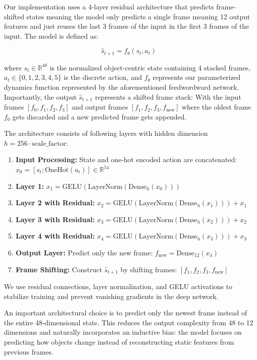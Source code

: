 \documentclass[
	english,
	ruledheaders=section,
	class=report,
	thesis={type=master},
	accentcolor=9c,
	custommargins=true,
	marginpar=false,
	parskip=half-,
	fontsize=11pt,
	pdfa=true,
]{tudapub}
\begin{document}
Our implementation uses a 4-layer residual architecture that predicts
frame-shifted states meaning the model only predicts a single frame meaning 12
output features and just reuses the last 3 frames of the input in the first 3
frames of the input. The model is defined as:

\begin{equation}
	\hat{s}_{t+1} = f_\theta(s_t, a_t)
\end{equation}

where $s_t \in \mathbb{R}^{48}$ is the normalized object-centric state
containing 4 stacked frames, $a_t \in \{0,1,2,3,4,5\}$ is the discrete action,
and $f_\theta$ represents our parameterized dynamics function represented by
the aforementioned feedwordward network. Importantly, the output
$\hat{s}_{t+1}$ represents a shifted frame stack: With the input frames $[f_0,
			f_1, f_2, f_3]$ and output frames $[f_1, f_2, f_3, f_{\text{new}}]$ where the
oldest frame $f_0$ gets discarded and a new predicted frame gets appended.

The architecture consists of following layers with hidden dimension $h = 256
	\cdot \text{scale\_factor}$:

\begin{enumerate}
	\item \textbf{Input Processing:} State and one-hot encoded action are concatenated: $x_0 = [s_t; \text{OneHot}(a_t)] \in \mathbb{R}^{54}$
	\item \textbf{Layer 1:} $x_1 = \text{GELU}(\text{LayerNorm}(\text{Dense}_h(x_0)))$
	\item \textbf{Layer 2 with Residual:} $x_2 = \text{GELU}(\text{LayerNorm}(\text{Dense}_h(x_1))) + x_1$
	\item \textbf{Layer 3 with Residual:} $x_3 = \text{GELU}(\text{LayerNorm}(\text{Dense}_h(x_2))) + x_2$
	\item \textbf{Layer 4 with Residual:} $x_4 = \text{GELU}(\text{LayerNorm}(\text{Dense}_h(x_3))) + x_3$
	\item \textbf{Output Layer:} Predict only the new frame: $f_{\text{new}} = \text{Dense}_{12}(x_4)$
	\item \textbf{Frame Shifting:} Construct $\hat{s}_{t+1}$ by shifting frames: $[f_1, f_2, f_3, f_{\text{new}}]$
\end{enumerate}

We use residual connections, layer normalization, and GELU activations to
stabilize training and prevent vanishing gradients in the deep network.

An important architectural choice is to predict only the newest frame instead
of the entire 48-dimensional state. This reduces the output complexity from 48
to 12 dimensions and naturally incorporates an inductive bias: the model
focuses on predicting how objects change instead of reconstructing static
features from previous frames.
\end{document}
